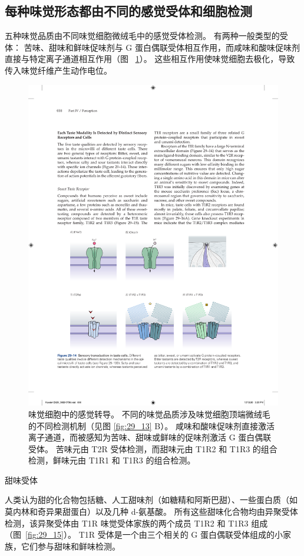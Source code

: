 \subsection{每种味觉形态都由不同的感觉受体和细胞检测}

五种味觉品质由不同味觉细胞微绒毛中的感觉受体检测。 
有两种一般类型的受体：
苦味、甜味和鲜味促味剂与 G 蛋白偶联受体相互作用，而咸味和酸味促味剂直接与特定离子通道相互作用（图 ~\ref{fig:29_14}）。 
这些相互作用使味觉细胞去极化，导致传入味觉纤维产生动作电位。


\begin{figure}[htbp]
	\centering
	\includegraphics[width=0.75\linewidth]{chap29/fig_29_14}
	\caption{味觉细胞中的感觉转导。
		不同的味觉品质涉及味觉细胞顶端微绒毛的不同检测机制（见图 \ref{fig:29_13} B）。
		咸味和酸味促味剂直接激活离子通道，而被感知为苦味、甜味或鲜味的促味剂激活 G 蛋白偶联受体。 苦味元由 T2R 受体检测，而甜味元由 T1R2 和 T1R3 的组合检测，鲜味元由 T1R1 和 T1R3 的组合检测。}
	\label{fig:29_14}
\end{figure}


甜味受体

人类认为甜的化合物包括糖、人工甜味剂（如糖精和阿斯巴甜）、一些蛋白质（如莫内林和奇异果甜蛋白）以及几种 d-氨基酸。
所有这些甜味化合物均由异聚受体检测，该异聚受体由 T1R 味觉受体家族的两个成员 T1R2 和 T1R3 组成（图~\ref{fig:29_15}）。
T1R 受体是一个由三个相关的 G 蛋白偶联受体组成的小家族，它们参与甜味和鲜味检测。


